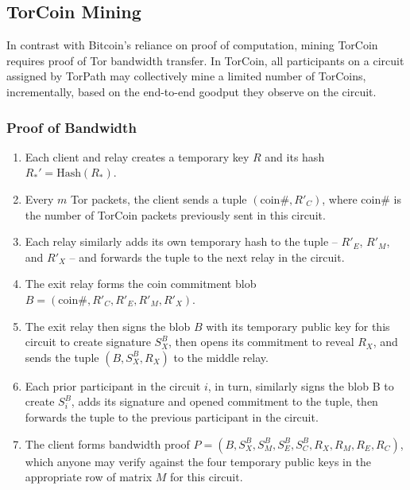 \subsection{TorCoin Mining}

In contrast with Bitcoin's reliance on proof of computation,
mining TorCoin requires proof of Tor bandwidth transfer.
In TorCoin, all participants on a circuit assigned by TorPath
may collectively mine a limited number of TorCoins, incrementally,
based on the end-to-end goodput they observe on the circuit.



\subsubsection{Proof of Bandwidth}
\begin{enumerate}
\item
Each client and relay creates a temporary key $R$
and its hash $R_*' = \textrm{Hash}(R_*)$. 

\item
Every $m$ Tor packets, the client sends a tuple $(\textrm{coin\#}, R'_C)$,
where coin\# is the number of TorCoin packets previously sent in this circuit.

\item
Each relay similarly adds its own temporary hash to the tuple --
$R'_E$, $R'_M$, and $R'_X$ --
and forwards the tuple to the next relay in the circuit.

\item
The exit relay forms the coin commitment blob
$B = (\textrm{coin\#}, R'_{C}, R'_{E}, R'_{M}, R'_{X})$.

\item
The exit relay then signs the blob $B$ with its temporary public key
for this circuit to create signature $S^B_X$,
then opens its commitment to reveal $R_X$,
and sends the tuple $(B, S^B_X, R_X)$ to the middle relay.

\item
Each prior participant in the circuit $i$, in turn,
similarly signs the blob B to create $S^B_i$,
adds its signature and opened commitment to the tuple,
then forwards the tuple to the previous participant in the circuit. 

\item
The client forms bandwidth proof
$P = (B, S^B_X, S^B_M, S^B_E, S^B_C, R_X, R_M, R_E, R_C)$,
which anyone may verify against the four temporary public keys
in the appropriate row of matrix $M$ for this circuit.


\end{enumerate}
